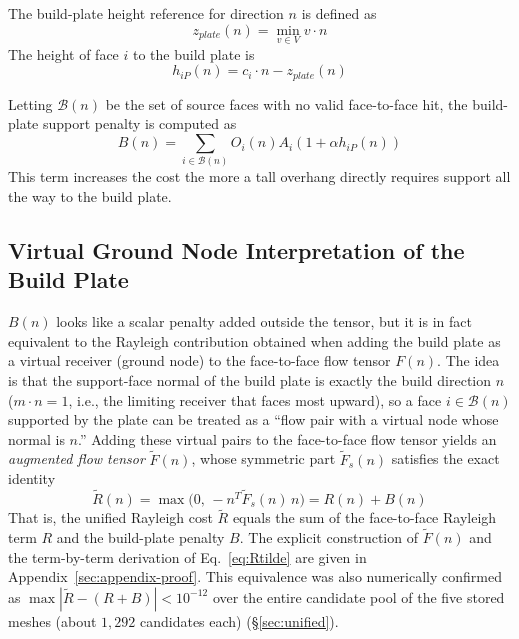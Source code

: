 \documentclass[11pt,a4paper]{article}
\begin{document}
The build-plate height reference for direction $n$ is defined as
\begin{equation}
z_{plate}(n)=\min_{v\in V} v\cdot n
\end{equation}
The height of face $i$ to the build plate is
\begin{equation}
h_{iP}(n)=c_i\cdot n-z_{plate}(n)
\end{equation}

Letting $\mathcal{B}(n)$ be the set of source faces with no valid face-to-face hit,
the build-plate support penalty is computed as
\begin{equation}
B(n)
=
\sum_{i\in\mathcal{B}(n)}
O_i(n)A_i\left(1+\alpha h_{iP}(n)\right)
\end{equation}
This term increases the cost the more a tall overhang directly requires support all the way to the build plate.

\subsection{Virtual Ground Node Interpretation of the Build Plate}
\label{sec:groundnode}

$B(n)$ looks like a scalar penalty added outside the tensor,
but it is in fact equivalent to the Rayleigh contribution obtained when adding the build plate as a virtual receiver (ground node)
to the face-to-face flow tensor $F(n)$.
The idea is that the support-face normal of the build plate is exactly the build direction $n$
($m\cdot n=1$, i.e., the limiting receiver that faces most upward),
so a face $i\in\mathcal{B}(n)$ supported by the plate can be treated as a ``flow pair with a virtual node whose normal is $n$.''
Adding these virtual pairs to the face-to-face flow tensor yields an \emph{augmented flow tensor} $\tilde F(n)$,
whose symmetric part $\tilde F_s(n)$ satisfies the exact identity
\begin{equation}
\tilde R(n)
=
\max\!\big(0,\,-n^T\tilde F_s(n)\,n\big)
=
R(n)+B(n)
\label{eq:Rtilde}
\end{equation}
That is, the unified Rayleigh cost $\tilde R$ equals the sum of the face-to-face Rayleigh term $R$ and the build-plate penalty $B$.
The explicit construction of $\tilde F(n)$ and the term-by-term derivation of Eq.~\eqref{eq:Rtilde} are given in Appendix~\ref{sec:appendix-proof}.
This equivalence was also numerically confirmed as $\max|\tilde R-(R+B)|<10^{-12}$ over the entire candidate pool of the five stored meshes
(about $1{,}292$ candidates each) (\S\ref{sec:unified}).
\end{document}
